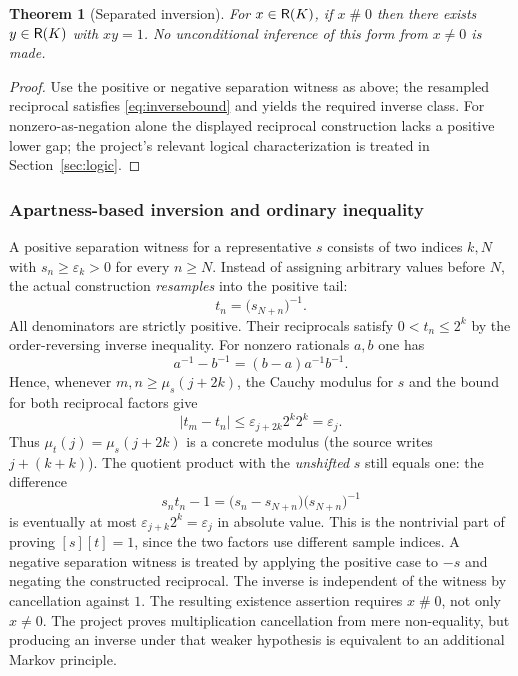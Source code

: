 \documentclass[11pt,reqno]{amsart}
\newtheorem{theorem}{Theorem}[section]
\theoremstyle{definition}\newtheorem{definition}[theorem]{Definition}
\theoremstyle{remark}\newtheorem{remark}[theorem]{Remark}
\newcommand{\eps}{\varepsilon}
\newcommand{\Apt}{\mathrel{\#}}
\begin{document}
\begin{theorem}[Separated inversion]\label{thm:sepinv}
For $x\in\mathsf R(K)$, if $x\Apt0$ then there exists $y\in\mathsf R(K)$ with $xy=1$. No unconditional inference of this form from $x\ne0$ is made.
\end{theorem}
\begin{proof}
Use the positive or negative separation witness as above; the resampled reciprocal satisfies \eqref{eq:inversebound} and yields the required inverse class. For nonzero-as-negation alone the displayed reciprocal construction lacks a positive lower gap; the project's relevant logical characterization is treated in Section~\ref{sec:logic}.
\end{proof}


\medskip
\subsubsection*{Apartness-based inversion and ordinary inequality}\label{supp:12-6}
\label{expanded:inverse}
A positive separation witness for a representative $s$ consists of two indices $k,N$ with $s_n\ge\eps_k>0$ for every $n\ge N$. Instead of assigning arbitrary values before $N$, the actual construction \emph{resamples} into the positive tail:
\[
 t_n=\bigl(s_{N+n}\bigr)^{-1}.
\]
All denominators are strictly positive. Their reciprocals satisfy $0<t_n\le2^k$ by the order-reversing inverse inequality. For nonzero rationals $a,b$ one has
\[
 a^{-1}-b^{-1}=(b-a)a^{-1}b^{-1}.
\]
Hence, whenever $m,n\ge\mu_s(j+2k)$, the Cauchy modulus for $s$ and the bound for both reciprocal factors give
\[
 |t_m-t_n|\le \eps_{j+2k}2^k2^k=\eps_j.
\]
Thus $\mu_t(j)=\mu_s(j+2k)$ is a concrete modulus (the source writes $j+(k+k)$). The quotient product with the \emph{unshifted} $s$ still equals one: the difference
\[
 s_nt_n-1=\bigl(s_n-s_{N+n}\bigr)\bigl(s_{N+n}\bigr)^{-1}
\]
is eventually at most $\eps_{j+k}2^k=\eps_j$ in absolute value. This is the nontrivial part of proving $[s][t]=1$, since the two factors use different sample indices. A negative separation witness is treated by applying the positive case to $-s$ and negating the constructed reciprocal. The inverse is independent of the witness by cancellation against $1$. The resulting existence assertion requires $x\Apt0$, not only $x\ne0$. The project proves multiplication cancellation from mere non-equality, but producing an inverse under that weaker hypothesis is equivalent to an additional Markov principle.
\medskip
\end{document}
